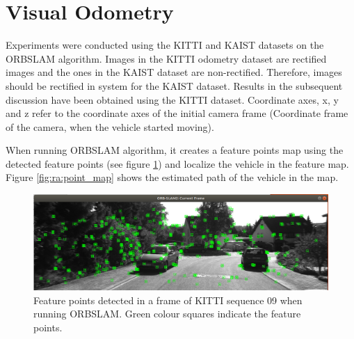 \section{Visual Odometry}
\label{sec:VisualOdometry}

Experiments were conducted using the \gls{KITTI} and \gls{KAIST} datasets on the \gls{ORBSLAM} algorithm. Images in the \gls{KITTI} odometry dataset are rectified images and the ones in the \gls{KAIST} dataset are non-rectified. Therefore, images should be rectified in system for the \gls{KAIST} dataset. Results in the subsequent discussion have been obtained using the \gls{KITTI} dataset. Coordinate axes, x, y and z refer to the coordinate axes of the initial camera frame (Coordinate frame of the camera, when the vehicle started moving).

When running \gls{ORBSLAM} algorithm, it creates a feature points map using the detected feature points (see figure \ref{fig:ra:detected_features}) and localize the vehicle in the feature map. Figure \ref{fig:ra:point_map} shows the estimated path of the vehicle in the map.
\begin{figure}[h]
	\centering
	\includegraphics[width=\textwidth]{figs/detected_features.png}
	\vspace{-0.5cm}
	\caption[Detected feature points]{Feature points detected in a frame of \gls{KITTI} sequence 09 when running \gls{ORBSLAM}. Green colour squares indicate the feature points.}
	\label{fig:ra:detected_features}
	\vspace{0.5cm}
\end{figure}
